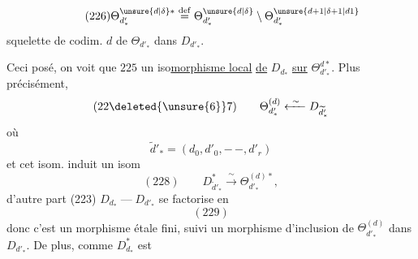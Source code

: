 \[
\tag{226}
\Theta_{d'_*}^{\unsure{d|\delta}*}\overset{\mathrm{def}}=
\Theta_{d'_*}^{\unsure{d|\delta}}\setminus
\Theta_{d'_*}^{\unsure{d+1|\delta+1|d1}}
\]
squelette 
de codim. $d$ de
$\Theta_{d'_*}$ dans $D_{d'_*}$.

Ceci posé, on voit que $225$ 
un  iso\uline{morphisme local}
\uline{de} $D_{d_*}$ \uline{sur}  $\Theta_{d'_*}^{d*}$. Plus
précisément, 
 \deleted{:}
\[
(22\deleted{\unsure{6}}7)\qquad
\Theta_{d'_*}^{(d)}\xleftarrow{\ \sim\ }D_{\widetilde d'_*}
\]
où 
\[
\widetilde d'_*=(d_0,d'_0,-\,-,d'_r)
\]
et cet isom. induit un isom
\[
(228)\qquad
D_{\widetilde d'_*}^{*}\xrightarrow{\ \sim\ }\Theta_{d'_*}^{(d)*},
\]
d'autre part (223) $D_{d_*}\mathrel{\text{---}}D_{d'_*}$ se
factorise en
\[
(229)
\]
donc c'est un morphisme étale fini,
suivi  un morphisme d'inclusion de
$\Theta_{d'_*}^{(d)}$ dans $D_{d'_*}$. De plus, comme $D_{d_*}^{*}$ est
